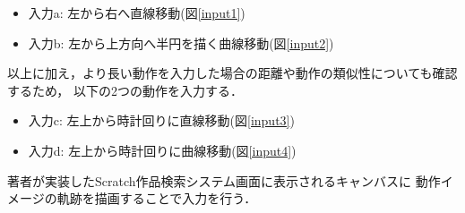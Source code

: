 \documentclass[11pt]{jreport}
\begin{document}
\begin{itemize}
    \item 入力a: 左から右へ直線移動(図\ref{input1})
    \item 入力b: 左から上方向へ半円を描く曲線移動(図\ref{input2})
\end{itemize}

以上に加え，より長い動作を入力した場合の距離や動作の類似性についても確認するため，
以下の2つの動作を入力する．

\begin{itemize}
    \item 入力c: 左上から時計回りに直線移動(図\ref{input3})
    \item 入力d: 左上から時計回りに曲線移動(図\ref{input4})
\end{itemize}

著者が実装したScratch作品検索システム画面に表示されるキャンバスに
動作イメージの軌跡を描画することで入力を行う．
\end{document}
